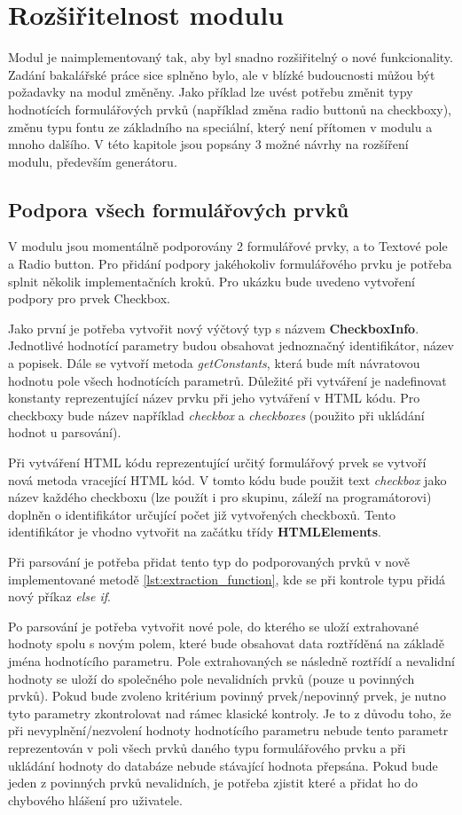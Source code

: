 \chapter{Rozšiřitelnost modulu}
Modul je naimplementovaný tak, aby byl snadno rozšiřitelný o nové funkcionality. Zadání bakalářské práce sice splněno bylo, ale v blízké budoucnosti můžou být požadavky na modul změněny. Jako příklad lze uvést potřebu změnit typy hodnotících formulářových prvků (například změna radio buttonů na checkboxy), změnu typu fontu ze základního na speciální, který není přítomen v modulu a mnoho dalšího. V této kapitole jsou popsány 3 možné návrhy na rozšíření modulu, především generátoru.

\section{Podpora všech formulářových prvků}
V modulu jsou momentálně podporovány 2 formulářové prvky, a to Textové pole a Radio button. Pro přidání podpory jakéhokoliv formulářového prvku je potřeba splnit několik implementačních kroků. Pro ukázku bude uvedeno vytvoření podpory pro prvek Checkbox.
\par
Jako první je potřeba vytvořit nový výčtový typ s názvem \textbf{CheckboxInfo}. Jednotlivé hodnotící parametry budou obsahovat jednoznačný identifikátor, název a popisek. Dále se vytvoří metoda \textit{getConstants}, která bude mít návratovou hodnotu pole všech hodnotících parametrů. Důležité při vytváření je nadefinovat konstanty reprezentující název prvku při jeho vytváření v HTML kódu. Pro checkboxy bude název například \textit{checkbox} a \textit{checkboxes} (použito při ukládání hodnot u parsování).
\par
Při vytváření HTML kódu reprezentující určitý formulářový prvek se vytvoří nová metoda vracející HTML kód. V tomto kódu bude použit text \textit{checkbox} jako název každého checkboxu (lze použít i pro skupinu, záleží na programátorovi) doplněn o identifikátor určující počet již vytvořených checkboxů. Tento identifikátor je vhodno vytvořit na začátku třídy \textbf{HTMLElements}.
\par
Při parsování je potřeba přidat tento typ do podporovaných prvků v nově implementované metodě \ref{lst:extraction_function}, kde se při kontrole typu přidá nový příkaz \textit{else if}.
\par
Po parsování je potřeba vytvořit nové pole, do kterého se uloží extrahované hodnoty spolu s novým polem, které bude obsahovat data roztříděná na základě jména hodnotícího parametru. Pole extrahovaných se následně roztřídí a nevalidní hodnoty se uloží do společného pole nevalidních prvků (pouze u povinných prvků). Pokud bude zvoleno kritérium povinný prvek/nepovinný prvek, je nutno tyto parametry zkontrolovat nad rámec klasické kontroly. Je to z důvodu toho, že při nevyplnění/nezvolení hodnoty hodnotícího parametru nebude tento parametr reprezentován v poli všech prvků daného typu formulářového prvku a při ukládání hodnoty do databáze nebude stávající hodnota přepsána. Pokud bude jeden z povinných prvků nevalidních, je potřeba zjistit které a přidat ho do chybového hlášení pro uživatele.
